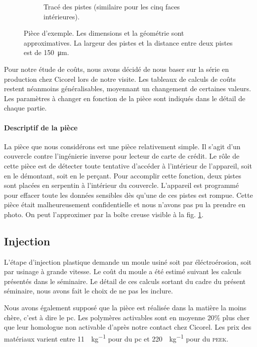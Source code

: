 \begin{figure}[h]
\begin{subfigure}[t]{0.4\textwidth}
                \caption{Tracé des pistes (similaire pour les cinq faces intérieures).}
        \end{subfigure}

        \caption{Pièce d'exemple. Les dimensions et la géométrie sont approximatives. La largeur des pistes et la distance entre deux pistes est de \SI{150}{\micro\meter}.}
        \label{fig:example-part}
\end{figure}
Pour notre étude de coûts, nous avons décidé de nous baser sur la série en production chez Cicorel lors de notre visite.
Les tableaux de calculs de coûts restent néanmoins généralisables, moyennant un changement de certaines valeurs.
Les paramètres à changer en fonction de la pièce sont indiqués dans le détail de chaque partie.


\paragraph{Descriptif de la pièce}
La pièce que nous considérons est une pièce relativement simple.
Il s'agit d'un couvercle contre l'ingénierie inverse pour lecteur de carte de crédit.
Le rôle de cette pièce est de détecter toute tentative d'accéder à l'intérieur de l'appareil, soit en le démontant, soit en le perçant.
Pour accomplir cette fonction, deux pistes sont placées en serpentin à l'intérieur du couvercle.
L'appareil est programmé pour effacer toute les données sensibles dès qu'une de ces pistes est rompue.
Cette pièce était malheureusement confidentielle et nous n'avons pas pu la prendre en photo.
On peut l'approximer par la boîte creuse visible à la fig. \ref{fig:example-part}.


\subsection{Injection}

L'étape d'injection plastique demande un moule usiné soit par éléctroérosion, soit par usinage à grande vitesse.
Le coût du moule a été estimé suivant les calculs présentés dans le séminaire\cite{electroerosion-2013}.
Le détail de ces calculs sortant du cadre du présent séminaire, nous avons fait le choix de ne pas les inclure. 

Nous avons également supposé que la pièce est réalisée dans la matière la moins chère, c'est à dire le \gls{pc}.
Les polymères activables sont en moyenne 20\% plus cher que leur homologue non activable d'après notre contact chez Cicorel.
Les prix des matériaux varient entre \SI{11}{\chf\per\kilogram} pour du \gls{pc} et \SI{220}{\chf\per\kilogram} pour du \textsc{peek}.
\clearpage

